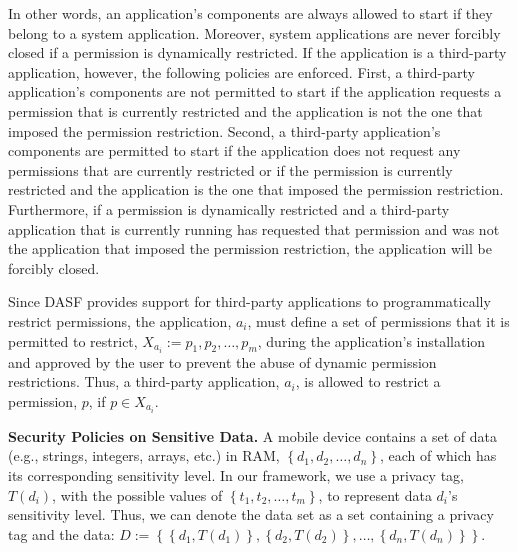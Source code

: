 
In other words, an application's components are always allowed to
start if they belong to a system application.  Moreover, system
applications are never forcibly closed if a permission is dynamically
restricted.  If the application is a third-party application, however,
the following policies are enforced. First, a third-party
application's components are not permitted to start if the application
requests a permission that is currently restricted and the application
is not the one that imposed the permission restriction.  Second, a
third-party application's components are permitted to start if the
application does not request any permissions that are currently
restricted or if the permission is currently restricted and the
application is the one that imposed the permission restriction.
Furthermore, if a permission is dynamically restricted and a
third-party application that is currently running has requested that
permission and was not the application that imposed the permission
restriction, the application will be forcibly closed.

Since DASF provides support for third-party
applications to programmatically restrict permissions, the
application, $a_{i}$, must define a set of permissions that it is
permitted to restrict, $X_{a_i} := {p_1, p_2,\ldots,p_m}$,
during the application's installation and approved by the user to prevent
the abuse of dynamic permission restrictions.  Thus, a third-party application,
$a_{i}$, is allowed to restrict a permission, $p$, if $p \in X_{a_{i}}$.

\textbf{Security Policies on Sensitive Data.}
A mobile device contains a set of data (e.g., strings, integers, arrays,
etc.) in RAM, $\left\{d_{1},d_{2},\ldots,d_{n}\right\}$,
each of which has its corresponding sensitivity level. In our
framework, we use a privacy tag, $T(d_i)$, with the possible values of
$\left\{t_{1},t_{2},\ldots,t_{m}\right\}$, to represent data $d_i$'s
sensitivity level.
%
Thus, we can denote the data set as a set containing a privacy tag and
the data:
$D := \left\{\left\{d_{1}, T\left(d_{1}\right)\right\},\left\{d_{2},T\left(d_{2}\right)\right\},\ldots,\left\{d_{n},T\left(d_{n}\right)\right\}\right\}$.

